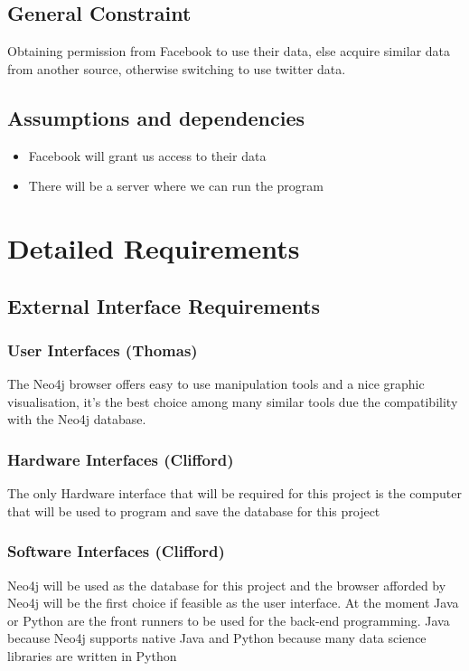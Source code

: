 \documentclass[11pt]{article}
\begin{document}
\subsection{General Constraint}
Obtaining permission from Facebook to use their data, else acquire similar data from another source, otherwise switching to use twitter data.

\subsection{Assumptions and dependencies}
\begin{itemize}
\item Facebook will grant us access to their data
\item There will be a server where we can run the program
\end{itemize}

\section{Detailed Requirements}
\subsection{External Interface Requirements}
\subsubsection{User Interfaces (Thomas)}
The Neo4j browser offers easy to use manipulation tools and a nice graphic visualisation, it's the best choice among many similar tools due the compatibility with the Neo4j database.
\subsubsection{Hardware Interfaces (Clifford)}
The only Hardware interface that will be required for this project is the computer that will be used to program and save the database for this project
\subsubsection{Software Interfaces (Clifford)}
Neo4j will be used as the database for this project and the browser afforded by Neo4j will be the first choice if feasible as the user interface. At the moment Java or Python are the front runners to be used for the back-end programming. Java because Neo4j supports native Java and Python because many data science libraries are written in Python
\end{document}
